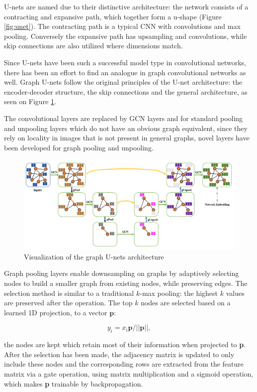 	
	U-nets are named due to their distinctive architecture: the network consists of a contracting and expansive path, which together form a u-shape (Figure \ref{fig:unet}). The contracting path is a typical CNN with convolutions and max pooling. Conversely the expansive path has upsampling and convolutions, while skip connections are also utilized where dimensions match.
	
	Since U-nets have been such a successful model type in convolutional networks, there has been an effort to find an analogue in graph convolutional networks as well. Graph U-nets \cite{graph-u-net} follow the original principles of the U-net architecture: the encoder-decoder structure, the skip connections and the general architecture, as seen on Figure \ref{fig:gunet}. 
	
	The convolutional layers are replaced by GCN layers and for standard pooling and unpooling layers which do not have an obvious graph equivalent, since they rely on locality in images that is not present in general graphs, novel layers have been developed for graph pooling and unpooling.
	
	\begin{figure}[!h]
		\centering
		\includegraphics[width=\textwidth]{figures/gunet.png}
		\caption{Visualization of the graph U-nets architecture\cite{graph-u-net}}
		\label{fig:gunet}
	\end{figure}
	
	Graph pooling layers enable downsampling on graphs by adaptively selecting nodes to build a smaller graph from existing nodes, while preserving edges. The selection method is similar to a traditional $k$-max pooling: the highest $k$ values are preserved after the operation. The top $k$ nodes are selected based on a learned 1D projection, to a vector $\textbf{p}$:
	
	
	$$ y_i = x_i\textbf{p}/||\textbf{p}||, $$
	
	the nodes are kept which retain most of their information when projected to \textbf{p}. After the selection has been made, the adjacency matrix is updated to only include these nodes and the corresponding rows are extracted from the feature matrix via a gate operation, using matrix multiplication and a sigmoid operation, which makes \textbf{p} trainable by backpropagation.
	
